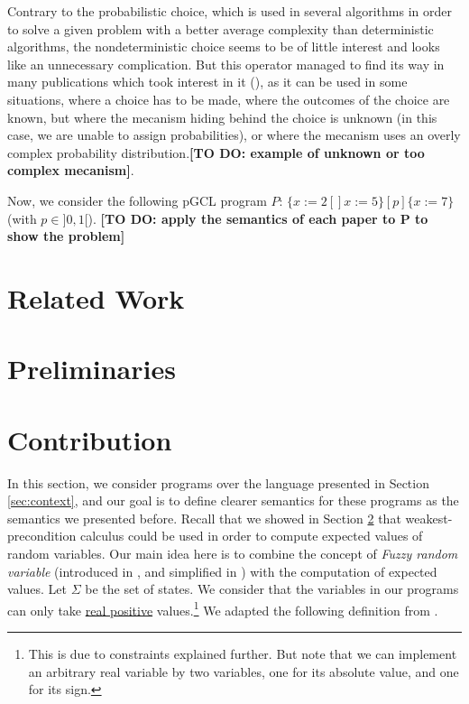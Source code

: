\documentclass[a4paper,10pt]{llncs}
\newcommand\todo[1]{{\color{red}\textbf{[TO DO:  #1]}}}
\begin{document}
Contrary to the probabilistic choice, which is used in several algorithms in order to solve a given problem with a better average complexity than deterministic algorithms, the nondeterministic choice seems to be of little interest and looks like an unnecessary complication. But this operator managed to find its way in many publications which took interest in it (\cite{WuChen08,WuChen11,WuChen12,McIver05}), as it can be used in some situations, where a choice has to be made, where the outcomes of the choice are known, but where the mecanism hiding behind the choice is unknown (in this case, we are unable to assign probabilities), or where the mecanism uses an overly complex probability distribution.\todo{example of unknown or too complex mecanism}.\newline

Now, we consider the following pGCL program $P$: $\{ x := 2 [\!] x := 5 \} [p] \{ x := 7 \}$ (with $p \in ]0,1[$). \todo{apply the semantics of each paper to P to show the problem}

\section{Related Work}
\label{sec:related}

\section{Preliminaries}
\label{sec:preliminaries}

\section{Contribution}
\label{sec:contribution}

In this section, we consider programs over the language presented in Section \ref{sec:context}, and our goal is to define clearer semantics for these programs as the semantics we presented before. Recall that we showed in Section \ref{sec:preliminaries} that weakest-precondition calculus could be used in order to compute expected values of random variables. Our main idea here is to combine the concept of \textit{Fuzzy random variable} (introduced in \cite{PuriRal86}, and simplified in \cite{Shapiro09}) with the computation of expected values.\newline
Let $\Sigma$ be the set of states. We consider that the variables in our programs can only take \underline{real positive} values.\footnote{This is due to constraints explained further. But note that we can implement an arbitrary real variable by two variables, one for its absolute value, and one for its sign.} We adapted the following definition from \cite{PuriRal86}.
\end{document}
